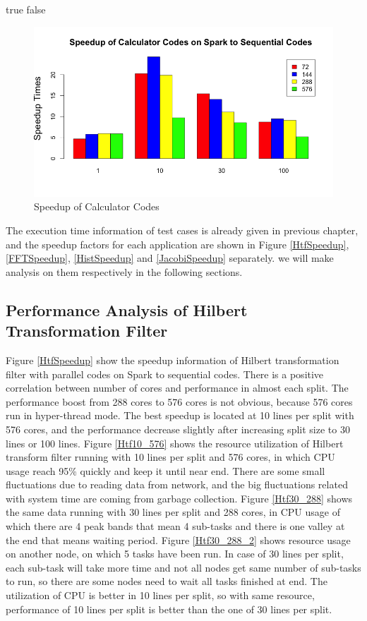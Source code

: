 \ifx true false
\begin{figure}[!ht]
\centering
\includegraphics[scale=.60]{figures/CalcSpeedup.png}
\caption{Speedup of Calculator Codes}
\label{CalcSpeedup}
\end{figure}
\fi 


The execution time information of test cases is already given in previous chapter, and the speedup factors for each application are shown in Figure \ref{HtfSpeedup}, \ref{FFTSpeedup}, \ref{HistSpeedup} and \ref{JacobiSpeedup} separately. we will make analysis on them respectively in the following sections. 

\subsection{Performance Analysis of Hilbert Transformation Filter}
Figure \ref{HtfSpeedup} show the speedup information of Hilbert transformation filter with parallel codes on Spark to sequential codes. There is a positive correlation between number of cores and performance in almost each split. The performance boost from 288 cores to 576 cores is not obvious, because 576 cores run in hyper-thread mode. The best speedup is located at 10 lines per split with 576 cores, and the performance decrease slightly after increasing split size to 30 lines or 100 lines. Figure \ref{Htf10_576} shows the resource utilization of Hilbert transform filter running with 10 lines per split and 576 cores, in which CPU usage reach 95\% quickly and keep it until near end. There are some small fluctuations due to reading data from network, and the big fluctuations related with system time are coming from garbage collection. Figure \ref{Htf30_288} shows the same data running with 30 lines per split and 288 cores, in CPU usage of which there are 4 peak bands that mean 4 sub-tasks and there is one valley at the end that means waiting period. Figure \ref{Htf30_288_2} shows resource usage on another node, on which 5 tasks have been run. In case of 30 lines per split, each sub-task will take more time and not all nodes get same number of sub-tasks to run, so there are some nodes need to wait all tasks finished at end. The utilization of CPU is better in 10 lines per split, so with same resource, performance of 10 lines per split is better than the one of 30 lines per split. 

